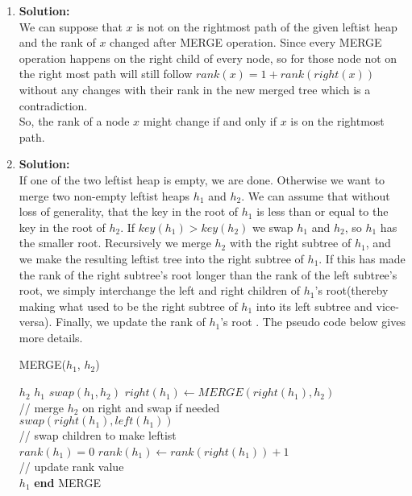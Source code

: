 \begin{enumerate}[label=(\alph*)]
	\item \textbf{Solution:} \\
	We can suppose that $x$ is not on the rightmost path of the given leftist heap and the rank of $x$ changed after MERGE operation. Since every MERGE operation happens on the right child of every node, so for those node not on the right most path will still follow $rank(x) = 1 + rank(right(x))$ without any changes with their rank in the new merged tree which is a contradiction.\\
	So, the rank of a node $x$ might change if and only if $x$ is on the rightmost path.

	\item \textbf{Solution:} \\
	If one of the two leftist heap is empty, we are done. Otherwise we want to merge two non-empty leftist heaps $h_1$ and $h_2$. We can assume that without loss of generality, that the key in the root of $h_1$ is less than or equal to the key in the root of $h_2$. If $key(h_1) > key(h_2)$ we swap $h_1$ and $h_2$, so $h_1$ has the smaller root. Recursively we merge $h_2$ with the right subtree of $h_1$, and we make the resulting leftist tree into the right subtree of $h_1$. If this has made the rank of the right subtree's root longer than the rank of the left subtree's root, we simply interchange the left and right children of $h_1$'s root(thereby making what used to be the right subtree of $h_1$ into its left subtree and vice-versa). Finally, we update the rank of $h_1$'s root . The pseudo code below gives more details. 
	\begin{algorithm}
	\caption{MERGE($h_1$, $h_2$)}\label{euclid}
	\begin{algorithmic}
	 \Return $h_2$
	 \Return $h_1$
	\Else
		\State $swap(h_1, h_2)$
		\EndIf
		$right(h_1) \gets MERGE(right(h_1), h_2) $ \\
		// merge $h_2$ on right and swap if needed \\
		\State $swap(right(h_1), left(h_1))$ \\
		// swap children to make leftist \\
		\EndIf
		\State $rank(h_1) = 0$
		\Else
		\State $rank(h_1) \gets rank(right(h_1)) + 1$ \\
		// update rank value \\
		\EndIf
		\Return $h_1$
	\EndIf
	\State \textbf{end} MERGE
	\end{algorithmic}
	\end{algorithm}


\end{enumerate}
